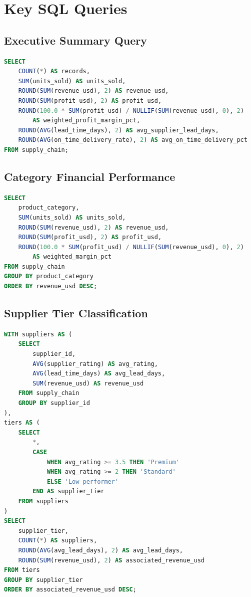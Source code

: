 \documentclass[11pt,a4paper]{article}
\begin{document}
\newpage
\appendix

\section{Key SQL Queries}

\subsection{Executive Summary Query}

\begin{lstlisting}[language=SQL]
SELECT
    COUNT(*) AS records,
    SUM(units_sold) AS units_sold,
    ROUND(SUM(revenue_usd), 2) AS revenue_usd,
    ROUND(SUM(profit_usd), 2) AS profit_usd,
    ROUND(100.0 * SUM(profit_usd) / NULLIF(SUM(revenue_usd), 0), 2) 
        AS weighted_profit_margin_pct,
    ROUND(AVG(lead_time_days), 2) AS avg_supplier_lead_days,
    ROUND(AVG(on_time_delivery_rate), 2) AS avg_on_time_delivery_pct
FROM supply_chain;
\end{lstlisting}

\subsection{Category Financial Performance}

\begin{lstlisting}[language=SQL]
SELECT
    product_category,
    SUM(units_sold) AS units_sold,
    ROUND(SUM(revenue_usd), 2) AS revenue_usd,
    ROUND(SUM(profit_usd), 2) AS profit_usd,
    ROUND(100.0 * SUM(profit_usd) / NULLIF(SUM(revenue_usd), 0), 2) 
        AS weighted_margin_pct
FROM supply_chain
GROUP BY product_category
ORDER BY revenue_usd DESC;
\end{lstlisting}

\subsection{Supplier Tier Classification}

\begin{lstlisting}[language=SQL]
WITH suppliers AS (
    SELECT
        supplier_id,
        AVG(supplier_rating) AS avg_rating,
        AVG(lead_time_days) AS avg_lead_days,
        SUM(revenue_usd) AS revenue_usd
    FROM supply_chain
    GROUP BY supplier_id
),
tiers AS (
    SELECT
        *,
        CASE
            WHEN avg_rating >= 3.5 THEN 'Premium'
            WHEN avg_rating >= 2 THEN 'Standard'
            ELSE 'Low performer'
        END AS supplier_tier
    FROM suppliers
)
SELECT
    supplier_tier,
    COUNT(*) AS suppliers,
    ROUND(AVG(avg_lead_days), 2) AS avg_lead_days,
    ROUND(SUM(revenue_usd), 2) AS associated_revenue_usd
FROM tiers
GROUP BY supplier_tier
ORDER BY associated_revenue_usd DESC;
\end{lstlisting}
\end{document}
